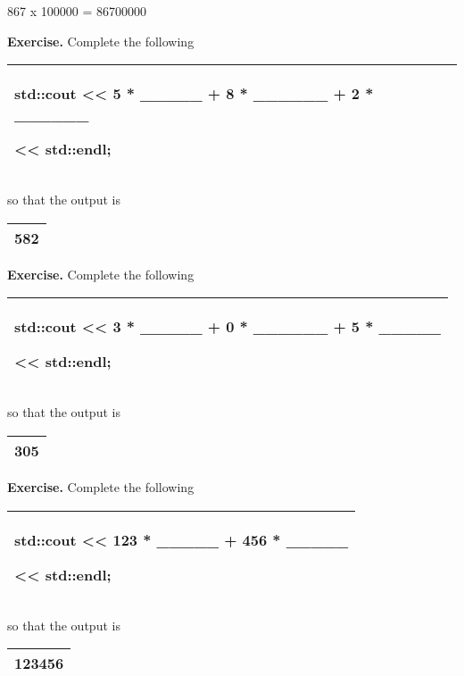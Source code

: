 \documentclass[
]{article}
\begin{document}
867 x 100000 = 86700000

\textbf{Exercise.} Complete the following

\begin{longtable}[]{@{}l@{}}
\toprule
\endhead
\begin{minipage}[t]{0.97\columnwidth}\raggedright
std::cout \textless\textless{} 5 * \_\_\_\_\_ + 8 * \_\_\_\_\_\_ + 2 *
\_\_\_\_\_\_

\textless\textless{} std::endl;\strut
\end{minipage}\tabularnewline
\bottomrule
\end{longtable}

so that the output is

\begin{longtable}[]{@{}l@{}}
\toprule
\endhead
582\tabularnewline
\bottomrule
\end{longtable}

\textbf{Exercise.} Complete the following

\begin{longtable}[]{@{}l@{}}
\toprule
\endhead
\begin{minipage}[t]{0.97\columnwidth}\raggedright
std::cout \textless\textless{} 3 * \_\_\_\_\_ + 0 * \_\_\_\_\_\_ + 5 *
\_\_\_\_\_

\textless\textless{} std::endl;\strut
\end{minipage}\tabularnewline
\bottomrule
\end{longtable}

so that the output is

\begin{longtable}[]{@{}l@{}}
\toprule
\endhead
305\tabularnewline
\bottomrule
\end{longtable}

\textbf{Exercise.} Complete the following

\begin{longtable}[]{@{}l@{}}
\toprule
\endhead
\begin{minipage}[t]{0.97\columnwidth}\raggedright
std::cout \textless\textless{} 123 * \_\_\_\_\_ + 456 * \_\_\_\_\_

\textless\textless{} std::endl;\strut
\end{minipage}\tabularnewline
\bottomrule
\end{longtable}

so that the output is

\begin{longtable}[]{@{}l@{}}
\toprule
\endhead
123456\tabularnewline
\bottomrule
\end{longtable}
\end{document}
